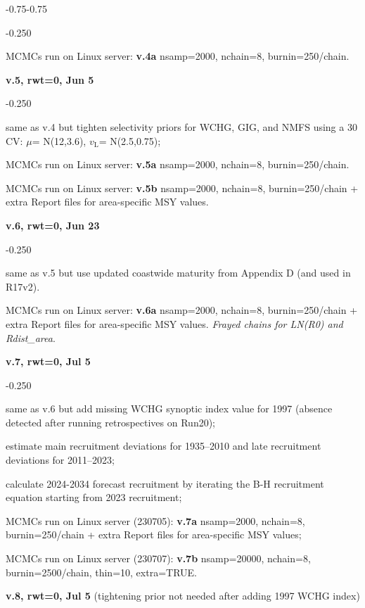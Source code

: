 \begin{itemize_csas}{-0.75}{-0.75}
\begin{itemize_csas}{-0.25}{0}
		\item MCMCs run on Linux server: \textbf{v.4a} nsamp=2000, nchain=8, burnin=250/chain.
	\end{itemize_csas}
	\item \textbf{v.5, rwt=0, Jun 5}
	\begin{itemize_csas}{-0.25}{0}
		\item same as v.4 but tighten selectivity priors for WCHG, GIG, and NMFS using a 30\pc{} CV: $\mu$= N(12,3.6), $v_\text{L}$= N(2.5,0.75);
		\item MCMCs run on Linux server: \textbf{v.5a} nsamp=2000, nchain=8, burnin=250/chain.
		\item MCMCs run on Linux server: \textbf{v.5b} nsamp=2000, nchain=8, burnin=250/chain + extra Report files for area-specific MSY values.
	\end{itemize_csas}
	\item \textbf{v.6, rwt=0, Jun 23}
	\begin{itemize_csas}{-0.25}{0}
		\item same as v.5 but use updated coastwide maturity from Appendix D (and used in R17v2).
		\item MCMCs run on Linux server: \textbf{v.6a} nsamp=2000, nchain=8, burnin=250/chain + extra Report files for area-specific MSY values. \emph{Frayed chains for LN(R0) and Rdist\_area}.
	\end{itemize_csas}
	\item \textbf{v.7, rwt=0, Jul 5}
	\begin{itemize_csas}{-0.25}{0}
		\item same as v.6 but add missing WCHG synoptic index value for 1997 (absence detected after running retrospectives on Run20);
		\item estimate main recruitment deviations for 1935--2010 and late recruitment deviations for 2011--2023;
		\item calculate 2024-2034 forecast recruitment by iterating the B-H recruitment equation starting from 2023 recruitment;
		\item MCMCs run on Linux server (230705): \textbf{v.7a} nsamp=2000, nchain=8, burnin=250/chain + extra Report files for area-specific MSY values;
		\item MCMCs run on Linux server (230707): \textbf{v.7b} nsamp=20000, nchain=8, burnin=2500/chain, thin=10, extra=TRUE.
	\end{itemize_csas}
	\item \textbf{v.8, rwt=0, Jul 5} (\alert{tightening prior not needed after adding 1997 WCHG index})

\end{itemize_csas}
